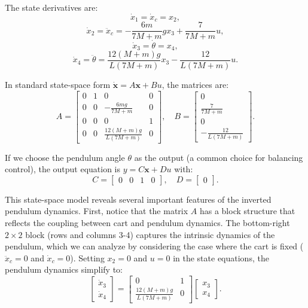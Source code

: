The state derivatives are:
\begin{equation}
\dot{x}_1 = \dot{x}_c = x_2,
\end{equation}
\begin{equation}
\dot{x}_2 = \ddot{x}_c = -\frac{6m}{7M + m}g x_3 + \frac{7}{7M + m}u,
\end{equation}
\begin{equation}
\dot{x}_3 = \dot{\theta} = x_4,
\end{equation}
\begin{equation}
\dot{x}_4 = \ddot{\theta} = \frac{12(M + m)g}{L(7M + m)} x_3 - \frac{12}{L(7M + m)}u.
\end{equation}

In standard state-space form $\dot{\mathbf{x}} = A\mathbf{x} + Bu$, the matrices are:
\begin{equation}
A = \begin{bmatrix}
0 & 1 & 0 & 0 \\
0 & 0 & -\frac{6mg}{7M + m} & 0 \\
0 & 0 & 0 & 1 \\
0 & 0 & \frac{12(M + m)g}{L(7M + m)} & 0
\end{bmatrix}, \quad
B = \begin{bmatrix} 0 \\ \frac{7}{7M + m} \\ 0 \\ -\frac{12}{L(7M + m)} \end{bmatrix}.
\end{equation}

If we choose the pendulum angle $\theta$ as the output (a common choice for balancing control), the output equation is $y = C\mathbf{x} + Du$ with:
\begin{equation}
C = \begin{bmatrix} 0 & 0 & 1 & 0 \end{bmatrix}, \quad D = \begin{bmatrix} 0 \end{bmatrix}.
\end{equation}

This state-space model reveals several important features of the inverted pendulum dynamics. First, notice that the matrix $A$ has a block structure that reflects the coupling between cart and pendulum dynamics. The bottom-right $2 \times 2$ block (rows and columns 3-4) captures the intrinsic dynamics of the pendulum, which we can analyze by considering the case where the cart is fixed ($\ddot{x}_c = 0$ and $\dot{x}_c = 0$). Setting $x_2 = 0$ and $u = 0$ in the state equations, the pendulum dynamics simplify to:
\begin{equation}
\begin{bmatrix} \dot{x}_3 \\ \dot{x}_4 \end{bmatrix} = \begin{bmatrix} 0 & 1 \\ \frac{12(M + m)g}{L(7M + m)} & 0 \end{bmatrix} \begin{bmatrix} x_3 \\ x_4 \end{bmatrix}.
\end{equation}

